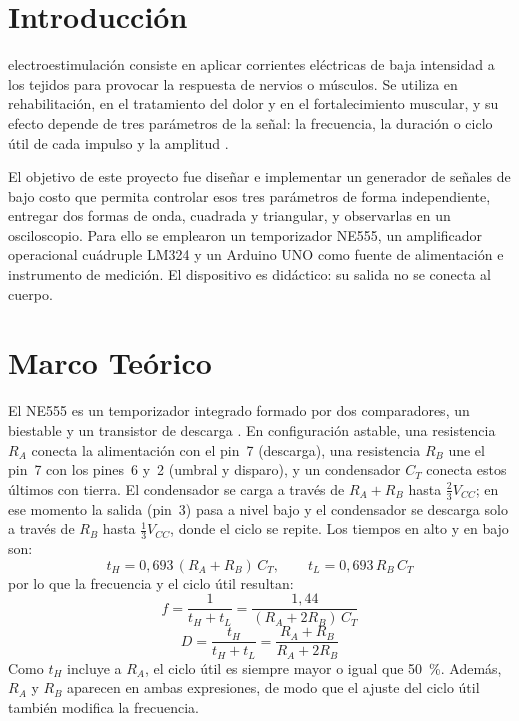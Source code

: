 \documentclass[conference]{IEEEtran}
\begin{document}
\section{Introducción}

 electroestimulación consiste en aplicar corrientes eléctricas de baja intensidad a los tejidos para provocar la respuesta de nervios o músculos. Se utiliza en rehabilitación, en el tratamiento del dolor y en el fortalecimiento muscular, y su efecto depende de tres parámetros de la señal: la frecuencia, la duración o ciclo útil de cada impulso y la amplitud \cite{low}.

El objetivo de este proyecto fue diseñar e implementar un generador de señales de bajo costo que permita controlar esos tres parámetros de forma independiente, entregar dos formas de onda, cuadrada y triangular, y observarlas en un osciloscopio. Para ello se emplearon un temporizador NE555, un amplificador operacional cuádruple LM324 y un Arduino UNO como fuente de alimentación e instrumento de medición. El dispositivo es didáctico: su salida no se conecta al cuerpo.

\section{Marco Teórico}

El NE555 es un temporizador integrado formado por dos comparadores, un biestable y un transistor de descarga \cite{ne555}. En configuración astable, una resistencia $R_A$ conecta la alimentación con el pin~7 (descarga), una resistencia $R_B$ une el pin~7 con los pines~6 y~2 (umbral y disparo), y un condensador $C_T$ conecta estos últimos con tierra. El condensador se carga a través de $R_A+R_B$ hasta $\tfrac{2}{3}V_{CC}$; en ese momento la salida (pin~3) pasa a nivel bajo y el condensador se descarga solo a través de $R_B$ hasta $\tfrac{1}{3}V_{CC}$, donde el ciclo se repite. Los tiempos en alto y en bajo son:
\begin{equation}
t_H = 0{,}693\,(R_A+R_B)\,C_T, \qquad t_L = 0{,}693\,R_B\,C_T
\end{equation}
por lo que la frecuencia y el ciclo útil resultan:
\begin{equation}
f = \frac{1}{t_H+t_L} = \frac{1{,}44}{(R_A+2R_B)\,C_T}
\label{eq:f}
\end{equation}
\begin{equation}
D = \frac{t_H}{t_H+t_L} = \frac{R_A+R_B}{R_A+2R_B}
\end{equation}
Como $t_H$ incluye a $R_A$, el ciclo útil es siempre mayor o igual que 50~\%. Además, $R_A$ y $R_B$ aparecen en ambas expresiones, de modo que el ajuste del ciclo útil también modifica la frecuencia.
\end{document}
